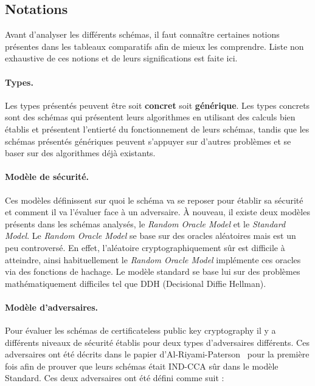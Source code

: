 \subsection{Notations}
\label{subsec:asavoir}
Avant d'analyser les différents schémas, il faut connaître certaines notions présentes dans les tableaux comparatifs afin de mieux les comprendre. Liste non exhaustive de ces notions et de leurs significations est faite ici.

\paragraph*{Types.}Les types présentés peuvent être soit \textbf{concret} soit \textbf{générique}. Les types concrets sont des schémas qui présentent leurs algorithmes en utilisant des calculs bien établis et présentent l'entierté du fonctionnement de leurs schémas, tandis que les schémas présentés génériques peuvent s'appuyer sur d'autres problèmes et se baser sur des algorithmes déjà existants.

\paragraph*{Modèle de sécurité.} Ces modèles définissent sur quoi le schéma va se reposer pour établir sa sécurité et comment il va l'évaluer face à un adversaire. À nouveau, il existe deux modèles présents dans les schémas analysés, le \textit{Random Oracle Model} et le \textit{Standard Model}. Le \textit{Random Oracle Model} se base sur des oracles aléatoires mais est un peu controversé. En effet, l'aléatoire cryptographiquement sûr est difficile à atteindre, ainsi habituellement le \textit{Random Oracle Model} implémente ces oracles via des fonctions de hachage. Le modèle standard se base lui sur des problèmes mathématiquement difficiles tel que DDH (Decisional Diffie Hellman).

\paragraph*{Modèle d'adversaires.}
Pour évaluer les schémas de certificateless public key cryptography il y a différents niveaux de sécurité établis pour deux types d'adversaires différents. Ces adversaires ont été décrits dans le papier d'Al-Riyami-Paterson~\cite{conf/asiacrypt/Al-RiyamiP03} pour la première fois afin de prouver que leurs schémas était IND-CCA sûr dans le modèle Standard. Ces deux adversaires ont été défini comme suit :

